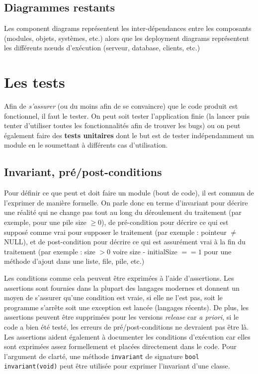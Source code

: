 \documentclass{article}
\begin{document}
	\subsection{Diagrammes restants}
		Les component diagrams représentent les inter-dépendances entre les composants (modules, objets, systèmes, etc.) alors que les deployment diagrams représentent les différents nœuds d'exécution
		(serveur, database, clients, etc.)

\section{Les tests}
	Afin de \textit{s'assurer} (ou du moins afin de se convaincre) que le code produit est fonctionnel, il faut le tester. On peut soit tester l'application finie (la lancer puis tenter d'utiliser
	toutes les fonctionnalités afin de trouver les bugs) ou on peut également faire des \textbf{tests unitaires} dont le but est de tester indépendamment un module en le soumettant à différents cas
	d'utilisation.

	\subsection{Invariant, pré/post-conditions}
		Pour définir ce que peut et doit faire un module (bout de code), il est commun de l'exprimer de manière formelle. On parle donc en terme d'invariant pour décrire une réalité qui ne change pas
		tout au long du déroulement du traitement (par exemple, pour une pile size $\geq 0$), de pré-condition pour décrire ce qui est supposé comme vrai pour supposer le traitement (par exemple :
		pointeur $\neq$ NULL), et de post-condition pour décrire ce qui est assurément vrai à la fin du traitement (par exemple : size $> 0$ voire size - initialSize $== 1$ pour une méthode d'ajout
		dans une liste, file, pile, etc.)

		Les conditions comme cela peuvent être exprimées à l'aide d'assertions. Les assertions sont fournies dans la plupart des langages modernes et donnent un moyen de s'assurer qu'une condition est
		vraie, si elle ne l'est pas, soit le programme s'arrête soit une exception est lancée (langages récents). De plus, les assertions peuvent être supprimées pour les versions \textit{release} car
		\textit{a priori}, si le code a bien été testé, les erreurs de pré/post-conditions ne devraient pas être là. Les assertions aident également à documenter les conditions d'exécution car elles
		sont exprimées assez formellement et placées directement dans le code. Pour l'argument de clarté, une méthode \texttt{invariant} de signature \texttt{bool invariant(void)} peut être utilisée
		pour exprimer l'invariant d'une classe.
\end{document}
